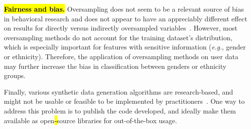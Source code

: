 \hl{\textbf{Fairness and bias.}} Oversampling does not seem to be a relevant
source of bias in behavioral research and does not appear to have an
appreciably different effect on results for directly versus indirectly
oversampled variables~\cite{hauner2014latent}. However, most oversampling
methods do not account for the training dataset's distribution, which is
especially important for features with sensitive information (\textit{e.g.},
gender or ethnicity). Therefore, the application of oversampling methods on
user data may further increase the bias in classification between genders or
ethnicity groups.

Finally, various synthetic data generation algorithms are research-based, and
might not be usable or feasible to be implemented by
practitioners~\cite{bayer2021survey}. One way to address this problem is to
publish the code developed, and ideally make them available as open\hl{-}source
libraries for out-of-the-box usage.


